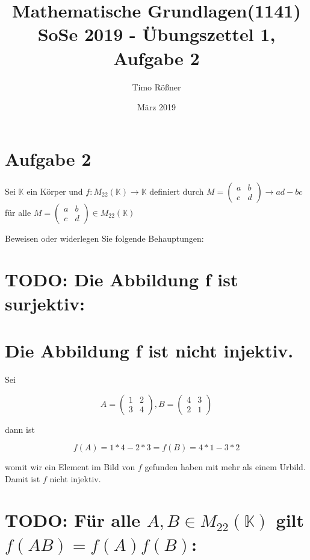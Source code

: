 \documentclass{article}
\title{Mathematische Grundlagen(1141) SoSe 2019 - Übungszettel 1, Aufgabe 2}
\author{Timo Rößner }
\date{März 2019}
\begin{document}
\maketitle

\section*{Aufgabe 2}

Sei \(\mathbb{K}\) ein Körper und \(f: M_{22}(\mathbb{K}) \rightarrow \mathbb{K}\) definiert durch
\(
M=
  \begin{pmatrix}
    a & b \\
    c & d
  \end{pmatrix}
\rightarrow ad - bc
\)
für alle
\(
M=
  \begin{pmatrix}
    a & b \\
    c & d
  \end{pmatrix}
\in M_{22}(\mathbb{K})
\)

Beweisen oder widerlegen Sie folgende Behauptungen:

\section{TODO: Die Abbildung f ist surjektiv:}


\section{Die Abbildung f ist nicht injektiv.}

Sei

\[
A=
  \begin{pmatrix}
    1 & 2 \\
    3 & 4
  \end{pmatrix}
,
B=
  \begin{pmatrix}
    4 & 3 \\
    2 & 1
  \end{pmatrix}
\]

dann ist

\[f(A) = 1*4 - 2*3 = f(B) = 4*1 - 3*2\]

womit wir ein Element im Bild von \(f\) gefunden haben mit mehr als einem Urbild. Damit ist \(f\) nicht injektiv.

\section{TODO: Für alle \(A, B\in M_{22}(\mathbb{K})\) gilt \(f(AB) = f(A) f(B)\):}
\end{document}
